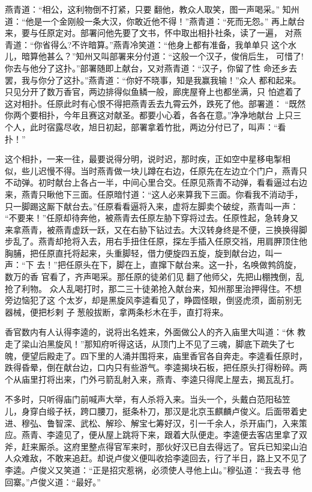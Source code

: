 燕青道：“相公，这利物倒不打紧，只要翻他，教众人取笑，图一声喝采。”
知州道：“他是一个金刚般一条大汉，你敢近他不得！”燕青道：“死而无怨。”
再上献台来，要与任原定对。部署问他先要了文书，怀中取出相扑社条，读了一遍，
对燕青道：“你省得么?不许暗算。”燕青冷笑道：“他身上都有准备，我单单只
这个水儿，暗算他甚么？”知州又叫部署来分付道：“这般一个汉子，俊俏后生，
可惜了!你去与他分了这扑。”部署随即上献台，又对燕青道：“汉子，你留了性
命还乡去罢，我与你分了这扑。”燕青道：“你好不晓事，知是我赢我输！”众人
都和起来。只见分开了数万香官，两边排得似鱼鳞一般，廊庑屋脊上也都坐满，只
怕遮着了这对相扑。任原此时有心恨不得把燕青丢去九霄云外，跌死了他。部署道：
“既然你两个要相扑，今年且赛这对献圣。都要小心着，各各在意。”净净地献台
上只三个人，此时宿露尽收，旭日初起，部署拿着竹批，两边分付已了，叫声：“看
扑！”

这个相扑，一来一往，最要说得分明，说时迟，那时疾，正如空中星移电掣相
似，些儿迟慢不得。当时燕青做一块儿蹲在右边，任原先在左边立个门户，燕青只
不动弹。初时献台上各占一半，中间心里合交。任原见燕青不动弹，看看逼过右边
来，燕青只瞅他下三面。任原暗忖道：“这人必来算我下三面。你看我不消动手，
只一脚踢这厮下献台去。”任原看看逼将入来，虚将左脚卖个破绽，燕青叫一声：
“不要来！”任原却待奔他，被燕青去任原左胁下穿将过去。任原性起，急转身又
来拿燕青，被燕青虚跃一跃，又在右胁下钻过去。大汉转身终是不便，三换换得脚
步乱了。燕青却抢将入去，用右手扭住任原，探左手插入任原交裆，用肩胛顶住他
胸脯，把任原直托将起来，头重脚轻，借力便旋四五旋，旋到献台边，叫一声：“下
去！”把任原头在下，脚在上，直撺下献台来。这一扑，名唤做鹁鸽旋，数万的香
官看了，齐声喝采。那任原的徒弟们见翻了他师父，先把山棚拽倒，乱抢了利物。
众人乱喝打时，那二三十徒弟抢入献台来，知州那里治押得住。不想旁边恼犯了这
个太岁，却是黑旋风李逵看见了，睁圆怪眼，倒竖虎须，面前别无器械，便把杉剌
子葱般拔断，拿两条杉木在手，直打将来。

香官数内有人认得李逵的，说将出名姓来，外面做公人的齐入庙里大叫道：“休
教走了梁山泊黑旋风！”那知府听得这话，从顶门上不见了三魂，脚底下疏失了七
魄，便望后殿走了。四下里的人涌并围将来，庙里香官各自奔走。李逵看任原时，
跌得昏晕，倒在献台边，口内只有些游气。李逵揭块石板，把任原头打得粉碎。两
个从庙里打将出来，门外弓箭乱射入来，燕青、李逵只得爬上屋去，揭瓦乱打。

不多时，只听得庙门前喊声大举，有人杀将入来。当头一个，头戴白范阳毡笠
儿，身穿白缎子袄，跨口腰刀，挺条朴刀，那汉是北京玉麒麟卢俊义。后面带着史
进、穆弘、鲁智深、武松、解珍、解宝七筹好汉，引一千余人，杀开庙门，入来策
应。燕青、李逵见了，便从屋上跳将下来，跟着大队便走。李逵便去客店里拿了双
斧，赶来厮杀。这府里整点得官军来时，那伙好汉已自去得远了。官兵已知梁山泊
人众难敌，不敢来追赶。却说卢俊义便叫收拾李逵回去，行了半日，路上又不见了
李逵。卢俊义又笑道：“正是招灾惹祸，必须使人寻他上山。”穆弘道：“我去寻
他回寨。”卢俊义道：“最好。”

